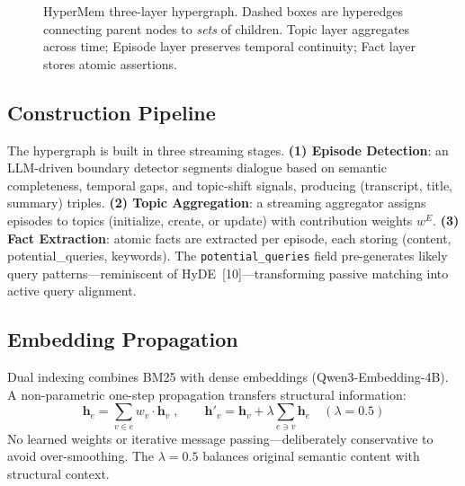\documentclass[11pt, a4paper]{article}
\begin{document}
\begin{figure}[H]
\caption{HyperMem three-layer hypergraph. Dashed boxes are hyperedges connecting parent nodes to \emph{sets} of children. Topic layer aggregates across time; Episode layer preserves temporal continuity; Fact layer stores atomic assertions.}
\label{fig:architecture}
\end{figure}

\subsection{Construction Pipeline}

The hypergraph is built in three streaming stages. \textbf{(1) Episode Detection}: an LLM-driven boundary detector segments dialogue based on semantic completeness, temporal gaps, and topic-shift signals, producing (transcript, title, summary) triples. \textbf{(2) Topic Aggregation}: a streaming aggregator assigns episodes to topics (initialize, create, or update) with contribution weights $w^E$. \textbf{(3) Fact Extraction}: atomic facts are extracted per episode, each storing (content, potential\_queries, keywords). The \texttt{potential\_queries} field pre-generates likely query patterns---reminiscent of HyDE~[10]---transforming passive matching into active query alignment.

\subsection{Embedding Propagation}

Dual indexing combines BM25 with dense embeddings (Qwen3-Embedding-4B). A non-parametric one-step propagation transfers structural information:
\begin{equation}
  \mathbf{h}_e = \sum_{v \in e} w_v \cdot \mathbf{h}_v \;,\qquad
  \mathbf{h}'_v = \mathbf{h}_v + \lambda \sum_{e \ni v} \mathbf{h}_e \quad (\lambda = 0.5)
\end{equation}
No learned weights or iterative message passing---deliberately conservative to avoid over-smoothing. The $\lambda = 0.5$ balances original semantic content with structural context.
\end{document}
